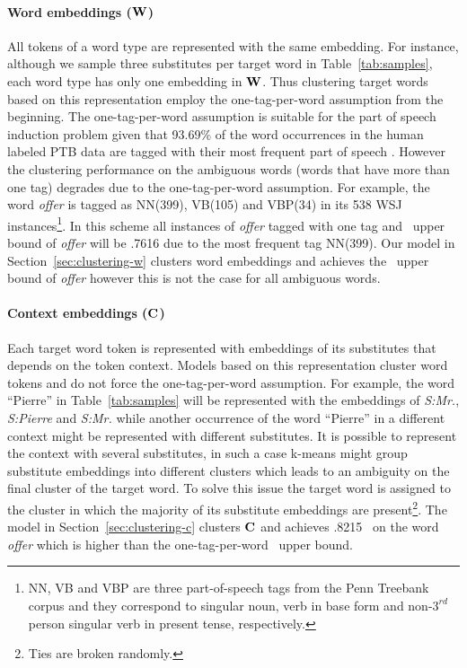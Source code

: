\paragraph{Word embeddings (${\bf W}$)} All tokens of a word type are
represented with the same embedding.  For instance, although we sample
three substitutes per target word in Table~\ref{tab:samples}, each
word type has only one embedding in ${\bf W}$.  Thus clustering target
words based on this representation employ the one-tag-per-word
assumption from the beginning.  The one-tag-per-word assumption is
suitable for the part of speech induction problem given that 93.69\%
of the word occurrences in the human labeled PTB data are tagged with
their most frequent part of speech
\cite{Toutanova:2003:FPT:1073445.1073478}.  However the clustering
performance on the ambiguous words (words that have more than one tag)
degrades due to the one-tag-per-word assumption.  For example, the
word {\em offer} is tagged as NN(399), VB(105) and VBP(34) in its 538
WSJ instances\footnote{NN, VB and VBP are three part-of-speech tags
  from the Penn Treebank corpus and they correspond to singular noun,
  verb in base form and non-$3^{rd}$person singular verb in present
  tense, respectively.}.  In this scheme all instances of {\em offer}
tagged with one tag and \mto\ upper bound of {\em offer} will be .7616
due to the most frequent tag NN(399). Our model in
Section~\ref{sec:clustering-w} clusters word embeddings and achieves
the \mto\ upper bound of {\em offer} however this is not the case for
all ambiguous words.

\paragraph{Context embeddings (${\bf C}$)} 
Each target word token is represented with embeddings of its
substitutes that depends on the token context.  Models based on this
representation cluster word tokens and do not force the
one-tag-per-word assumption.  For example, the word ``Pierre'' in
Table~\ref{tab:samples} will be represented with the embeddings of
{\it S:Mr.}, {\it S:Pierre} and {\it S:Mr.}  while another occurrence
of the word ``Pierre'' in a different context might be represented
with different substitutes.  It is possible to represent the context
with several substitutes, in such a case k-means might group
substitute embeddings into different clusters which leads to an
ambiguity on the final cluster of the target word.  To solve this
issue the target word is assigned to the cluster in which the majority
of its substitute embeddings are present\footnote{Ties are broken
  randomly.}.  The model in Section~\ref{sec:clustering-c} clusters
${\bf C}$ and achieves .8215 \mto\ on the word {\em offer} which is
higher than the one-tag-per-word \mto\ upper bound.

